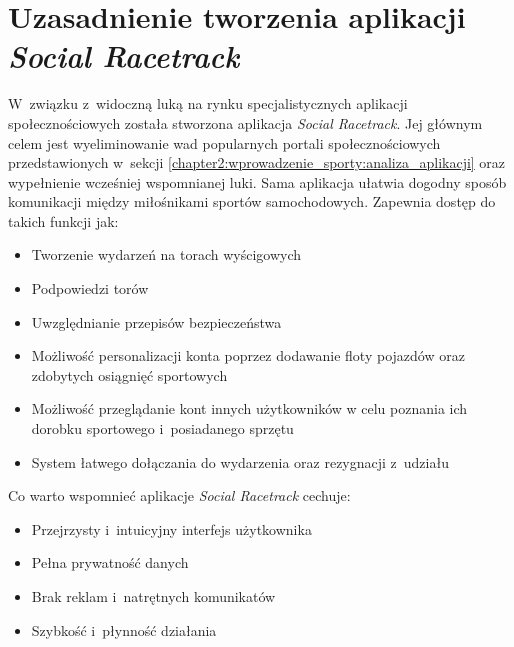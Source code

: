 \documentclass[../Kamil_Kowalewski_Main.tex]{subfiles}
\begin{document}
{    \section{Uzasadnienie tworzenia aplikacji \textit{Social Racetrack}}
    \label{chapter2:wprowadzenie_sporty:uzasadnienie} {
        W~związku z~widoczną luką na rynku specjalistycznych aplikacji społecznościowych
        została stworzona aplikacja \textit{Social Racetrack}. Jej głównym celem jest
        wyeliminowanie wad popularnych portali społecznościowych przedstawionych w~sekcji
        \ref{chapter2:wprowadzenie_sporty:analiza_aplikacji} oraz wypełnienie wcześniej
        wspomnianej luki. Sama aplikacja ułatwia dogodny sposób komunikacji między
        miłośnikami sportów samochodowych. Zapewnia dostęp do takich funkcji jak:
        \begin{itemize}[noitemsep,topsep=2pt]
            \item Tworzenie wydarzeń na torach wyścigowych
            \item Podpowiedzi torów
            \item Uwzględnianie przepisów bezpieczeństwa
            \item Możliwość personalizacji konta poprzez dodawanie floty pojazdów oraz
            zdobytych osiągnięć sportowych
            \item Możliwość przeglądanie kont innych użytkowników w celu poznania ich
            dorobku sportowego i~posiadanego sprzętu
            \item System łatwego dołączania do wydarzenia oraz rezygnacji z~udziału
        \end{itemize}

        \noindent Co warto wspomnieć aplikacje \textit{Social Racetrack} cechuje:
        \begin{itemize}[noitemsep,topsep=2pt]
            \item Przejrzysty i~intuicyjny interfejs użytkownika
            \item Pełna prywatność danych
            \item Brak reklam i~natrętnych komunikatów
            \item Szybkość i~płynność działania
        \end{itemize}
    }
}
\end{document}
